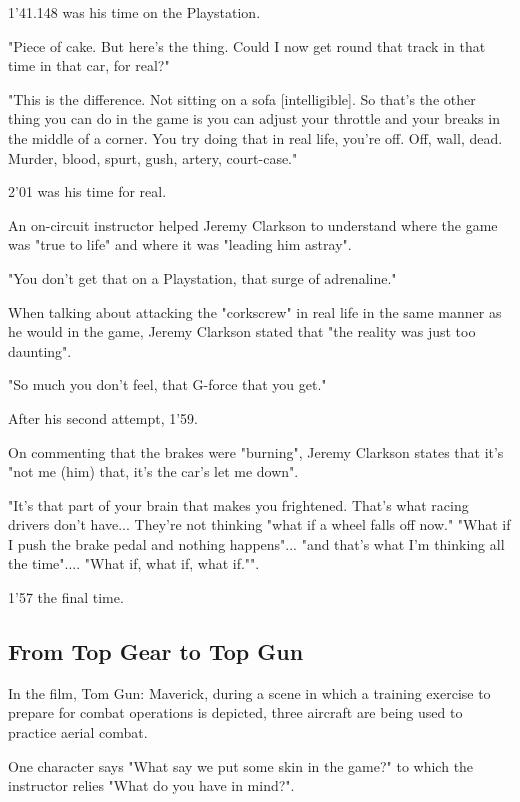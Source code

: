 \documentclass{article}
\begin{document}

1'41.148 was his time on the Playstation.

"Piece of cake. But here's the thing. Could I now get round that track in that time in that car, for real?"

"This is the difference. Not sitting on a sofa [intelligible]. So that's the other thing you can do in the game is you can adjust your throttle and your breaks in the middle of a corner. You try doing that in real life, you're off. Off, wall, dead. Murder, blood, spurt, gush, artery, court-case."

2'01 was his time for real. 

An on-circuit instructor helped Jeremy Clarkson to understand where the game was "true to life" and where it was "leading him astray".

"You don't get that on a Playstation, that surge of adrenaline." 

When talking about attacking the "corkscrew" in real life in the same manner as he would in the game, Jeremy Clarkson stated that "the reality was just too daunting". 

"So much you don't feel, that G-force that you get."

After his second attempt, 1'59. 

On commenting that the brakes were "burning", Jeremy Clarkson states that it's "not me (him) that, it's the car's let me down". 

"It's that part of your brain that makes you frightened. That's what racing drivers don't have... They're not thinking "what if a wheel falls off now." "What if I push the brake pedal and nothing happens"... "and that's what I'm thinking all the time".... "What if, what if, what if."".

1'57 the final time.

\subsection{From Top Gear to Top Gun}

In the film, Tom Gun: Maverick, during a scene in which a training exercise to prepare for combat operations is depicted, three aircraft are being used to practice aerial combat. 

One character says "What say we put some skin in the game?" to which the instructor relies "What do you have in mind?".
\end{document}
